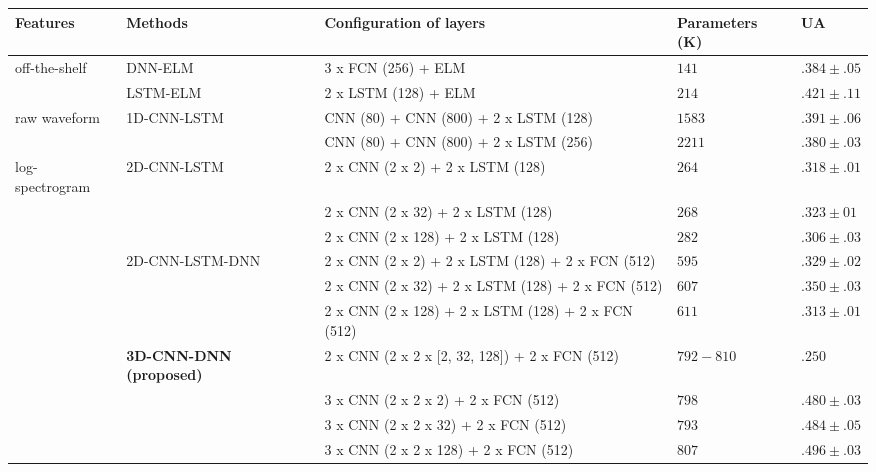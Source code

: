 \documentclass[conference, compsoc, twoside]{IEEEtran}
\begin{document}
\begin{table*}[!th]
\centering
\begin{tabular}{lllll}
\hline
Features & Methods            &   Configuration of layers         & Parameters (K) & UA \\
\hline
off-the-shelf & DNN-ELM~\cite{kunHan2014dnn}      & 3 x FCN (256) + ELM   & $141$ & $.384\pm.05$\\
        & LSTM-ELM~\cite{lee2015high}       & 2 x LSTM (128) + ELM  & $214$ & $.421\pm.11$\\
\hline
raw waveform & 1D-CNN-LSTM~\cite{trigeorgis2016adieu}  & CNN (80) + CNN (800) + 2 x LSTM (128) & $1583$ & $.391\pm.06$\\
        & & CNN (80) + CNN (800) + 2 x LSTM (256) & $2211$ & $.380\pm.03$\\   
\hline
log-spectrogram & 2D-CNN-LSTM~\cite{anandconvoluted}  & 2 x CNN (2 x 2) + 2 x LSTM (128) & $264$ & $.318\pm.01$\\
        &         & 2 x CNN (2 x 32) + 2 x LSTM (128) & $268$ & $.323\pm01$\\
        &         & 2 x CNN (2 x 128) + 2 x LSTM (128) & $282$ & $.306\pm.03$\\ 
        \cline{2-5}
        & 2D-CNN-LSTM-DNN~\cite{sainath2015convolutional} & 2 x CNN (2 x 2) + 2 x LSTM (128) + 2 x FCN (512) & $595$ & $.329\pm.02$\\
        &       & 2 x CNN (2 x 32) + 2 x LSTM (128) + 2 x FCN (512) & $607$ & $.350\pm.03$\\
        &       & 2 x CNN (2 x 128) + 2 x LSTM (128) + 2 x FCN (512) & $611$ & $.313\pm.01$\\
        \cline{2-5}

        & \textbf{3D-CNN-DNN (proposed)}  & 2 x CNN (2 x 2 x [2, 32, 128]) + 2 x FCN (512) & $792 - 810$  & $.250$\\ 
        &       & 3 x CNN (2 x 2 x 2) + 2 x FCN (512) & $798$ & $.480\pm.03$\\
        &       & 3 x CNN (2 x 2 x 32) + 2 x FCN (512) & $793$  & $.484\pm.05$\\
        &       & 3 x CNN (2 x 2 x 128) + 2 x FCN (512) & $807$  & $\mathbf{.496\pm.03}$\\
        \cline{2-5}


\end{tabular}
\end{table*}
\end{document}
